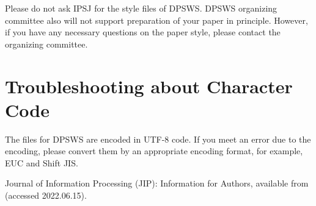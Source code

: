 \documentclass[techreq,english]{dpsws}
\begin{document}
Please do not ask IPSJ for the style files of DPSWS. 
DPSWS organizing committee 
also will not support preparation of your paper in principle. 
However, 
if you have any necessary questions on the paper style, 
please contact the organizing committee. 


\section{Troubleshooting about Character Code}

The files for DPSWS are encoded in UTF-8 code.
If you meet an error due to the encoding, please convert them by an appropriate encoding format, for example, EUC and Shift JIS.



\begin{thebibliography}{10}                                                    

Journal of Information Processing (JIP): 
Information for Authors,
available from  (accessed 2022.06.15).

\end{thebibliography}
\end{document}
